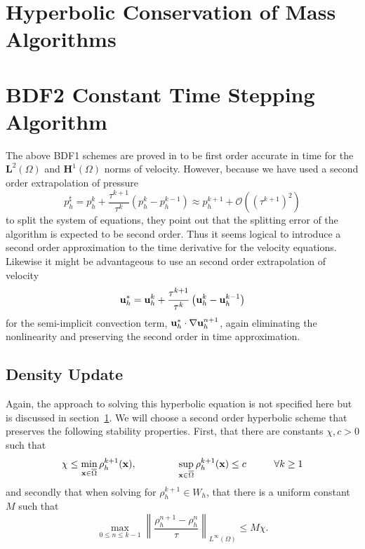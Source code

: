 \documentclass[letterpaper]{erdc}
\begin{document}
\section{Hyperbolic Conservation of Mass Algorithms}\label{sec:ConservationOfMassNumericalApproach}



%
%
\section{BDF2 Constant Time Stepping Algorithm}\label{sec:BDF2ConstantTimeSteppingAlgorithm}

The above BDF1 schemes are proved in \cite{Guermond2011} to be first order accurate in time for the $\mathbf{L}^2(\Omega)$ and $\mathbf{H}^1(\Omega)$ norms of velocity.  However, because we have used a second order extrapolation of pressure
\begin{equation}
  p^{\sharp}_h = p_h^{k} + \frac{\tau^{k+1}}{\tau^{k}}\left( p_h^{k} - p_h^{k-1} \right) \approx p_h^{k+1} + \mathcal{O}\left(\left(\tau^{k+1}\right)^2 \right)
\end{equation}
to split the system of equations, they point out that the splitting error of the algorithm is expected to be second order.  Thus it seems logical to introduce a second order approximation to the time derivative for the velocity equations.  Likewise it might be advantageous to use an second order extrapolation of velocity 
\begin{equation}
  \textbf{u}^{*}_h = \textbf{u}_h^{k} + \frac{\tau^{k+1}}{\tau^{k}}\left( \textbf{u}_h^{k} - \textbf{u}_h^{k-1} \right)
\end{equation}
for the semi-implicit convection term, $\textbf{u}_h^{*}\cdot\nabla\textbf{u}_h^{n+1}$, again eliminating the nonlinearity and preserving the second order in time approximation.


\subsection{Density Update}
Again, the approach to solving this hyperbolic equation is not specified here but is discussed in section~\ref{sec:ConservationOfMassNumericalApproach}.  We will choose a second order hyperbolic scheme that preserves the following stability properties.  First, that there are constants $\chi, c > 0$ such that 
\begin{equation}
  \chi \leq \displaystyle\min_{\textbf{x}\in\overline{\Omega}} \rho_h^{k+1}(\textbf{x}),  \hspace{1.5cm} \displaystyle\sup_{\textbf{x}\in\overline{\Omega}}\rho_h^{k+1}(\textbf{x}) \leq c \hspace{1cm} \forall k\geq 1
\end{equation}
and secondly that when solving for $\rho_h^{k+1}\in W_h$, that there is a uniform constant $M$ such that
\begin{equation}
  \displaystyle\max_{0\leq n\leq k-1} \left \| \frac{\rho_h^{n+1} - \rho_h^{n}}{\tau}\right\|_{L^{\infty}(\Omega)} \leq M\chi.
\end{equation}
\end{document}
